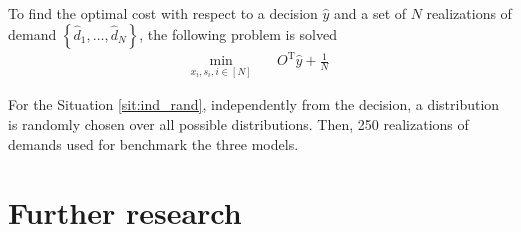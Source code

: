 \documentclass[12pt, letterpaper]{article}
\newcommand{\T}{\mathrm{T}}
\begin{document}
	To find the optimal cost with respect to a decision $\hat{y}$ and a set of $N$ realizations of demand $\left\{\hat{d}_1, \dots, \hat{d}_N\right\}$, the following problem is solved
	\begin{subequations}
		\begin{align}
			\min_{x_i, s_i, i \in [N]} &\quad O^\T\hat{y} + \frac{1}{N}
		\end{align}
	\end{subequations}
	
	For the Situation \ref{sit:ind_rand}, independently from the decision, a distribution is randomly chosen over all possible distributions. Then, 250 realizations of demands used for benchmark the three models.
	
	\section{Further research}
	
	\clearpage
	\printglossary[type=\acronymtype]
	
	\clearpage
	
	
\end{document}
